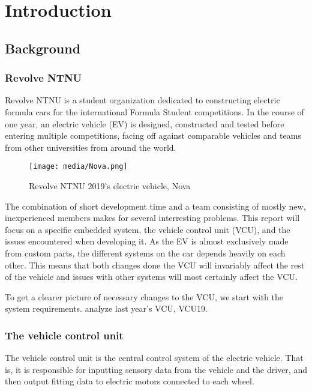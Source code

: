 \section{Introduction}

\subsection{Background}

\subsubsection{Revolve NTNU}

Revolve NTNU is a student organization dedicated to constructing electric formula cars for the international Formula Student competitions. In the course of one year, an electric vehicle (EV) is designed, constructed and tested before entering multiple competitions, facing off against comparable vehicles and teams from other universities from around the world.

\begin{figure}[H]
    \centering
    \texttt{[image: media/Nova.png]}
    \caption{Revolve NTNU 2019's electric vehicle, Nova}
    \label{fig:nova}
\end{figure}

The combination of short development time and a team consisting of mostly new, inexperienced members makes for several interresting problems. This report will focus on a specific embedded system, the vehicle control unit (VCU), and the issues encountered when developing it. As the EV is almost exclusively made from custom parts, the different systems on the car depends heavily on each other. This means that both changes done the VCU will invariably affect the rest of the vehicle and issues with other systems will most certainly affect the VCU. 

To get a clearer picture of necessary changes to the VCU, we start with the system requirements. analyze last year's VCU, VCU19.

\subsubsection{The vehicle control unit}

The vehicle control unit is the central control system of the electric vehicle. That is, it is responsible for inputting sensory data from the vehicle and the driver, and then output fitting data to electric motors connected to each wheel.

